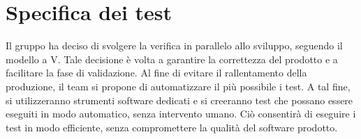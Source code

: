 \section{Specifica dei test}
Il gruppo \groupName ha deciso di svolgere la verifica in parallelo allo sviluppo,
seguendo il modello a V. Tale decisione è volta a garantire la correttezza del prodotto
e a facilitare la fase di validazione. Al fine di evitare il rallentamento della produzione,
il team si propone di automatizzare il più possibile i test. A tal fine,
si utilizzeranno strumenti software dedicati e si creeranno test che possano essere
eseguiti in modo automatico, senza intervento umano. Ciò consentirà di eseguire i
test in modo efficiente, senza compromettere la qualità del software prodotto.